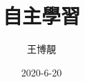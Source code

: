 \documentclass{report}
\title{自主學習}
\author{王博靚}
\date{2020-6-20}
\begin{document}
\begin{CJK}{UTF8}{bkai}

    
    \maketitle
    
    
    
    
    
    

    
\end{CJK}
\end{document}
